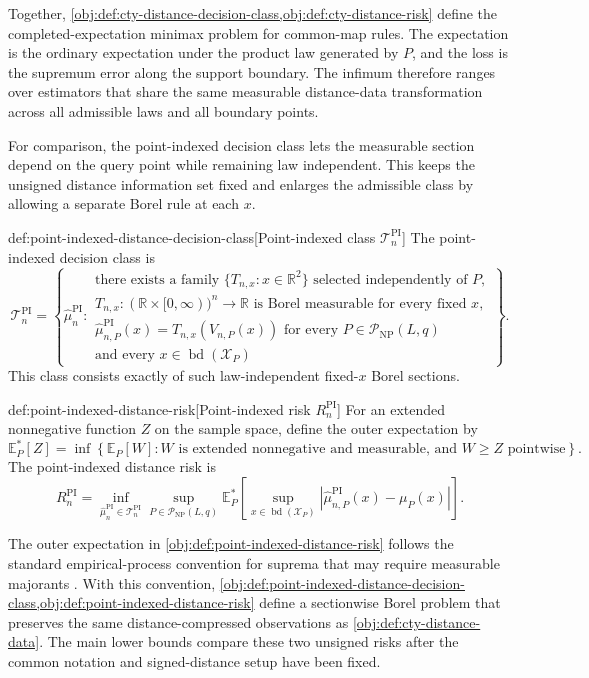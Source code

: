 Together, \cref{obj:def:cty-distance-decision-class,obj:def:cty-distance-risk} define the completed-expectation minimax problem for common-map rules. The expectation is the ordinary expectation under the product law generated by \(P\), and the loss is the supremum error along the support boundary. The infimum therefore ranges over estimators that share the same measurable distance-data transformation across all admissible laws and all boundary points.

For comparison, the point-indexed decision class lets the measurable section depend on the query point while remaining law independent. This keeps the unsigned distance information set fixed and enlarges the admissible class by allowing a separate Borel rule at each \(x\).

\begin{definitionv}{def:point-indexed-distance-decision-class}[Point-indexed class $\mathcal T_n^{\mathrm{PI}}$]
The point-indexed decision class is
\[
\mathcal T_n^{\mathrm{PI}}
=
\left\{
\widehat\mu_n^{\mathrm{PI}}:
\begin{array}{l}
\text{there exists a family }\{T_{n,x}:x\in\mathbb R^2\}
\text{ selected independently of }P,\\
T_{n,x}:(\mathbb R\times[0,\infty))^n\to\mathbb R
\text{ is Borel measurable for every fixed }x,\\
\widehat\mu_{n,P}^{\mathrm{PI}}(x)=T_{n,x}(V_{n,P}(x))
\text{ for every }P\in\mathcal P_{\mathrm{NP}}(L,q)\\
\text{and every }x\in\operatorname{bd}(\mathcal X_P)
\end{array}
\right\}.
\]
This class consists exactly of such law-independent fixed-\(x\) Borel sections.
\end{definitionv}

\begin{definitionv}{def:point-indexed-distance-risk}[Point-indexed risk \(R_n^{\mathrm{PI}}\)]
For an extended nonnegative function \(Z\) on the sample space, define the outer expectation by
\[
\mathbb E_P^*[Z]
=
\inf\left\{
\mathbb E_P[W]:
W\text{ is extended nonnegative and measurable, and }W\geq Z\text{ pointwise}
\right\}.
\]
The point-indexed distance risk is
\[
R_n^{\mathrm{PI}}
=
\inf_{\widehat\mu_n^{\mathrm{PI}}\in\mathcal T_n^{\mathrm{PI}}}
\sup_{P\in\mathcal P_{\mathrm{NP}}(L,q)}
\mathbb E_P^*\!\left[
\sup_{x\in\operatorname{bd}(\mathcal X_P)}
\left|\widehat\mu_{n,P}^{\mathrm{PI}}(x)-\mu_P(x)\right|
\right].
\]
\end{definitionv}

The outer expectation in \cref{obj:def:point-indexed-distance-risk} follows the standard empirical-process convention for suprema that may require measurable majorants \citep{VanderVaart1996}. With this convention, \cref{obj:def:point-indexed-distance-decision-class,obj:def:point-indexed-distance-risk} define a sectionwise Borel problem that preserves the same distance-compressed observations as \cref{obj:def:cty-distance-data}. The main lower bounds compare these two unsigned risks after the common notation and signed-distance setup have been fixed.
